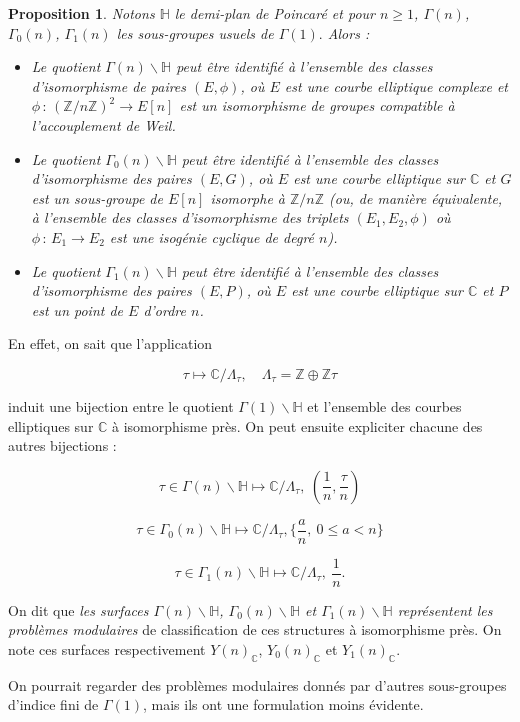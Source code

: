 \documentclass[11pt,a4paper]{article}
\newcommand{\Z}{\mathbb{Z}}
\newcommand{\C}{\mathbb{C}}
\renewcommand{\H}{\mathbb{H}}
\renewcommand{\b}{\backslash}
\newcommand{\vers}{\rightarrow}
\newcommand{\de}{\,:\,}
\newtheorem{prop}[thm]{Proposition}
\theoremstyle{definition}
\begin{document}
\begin{prop}

Notons $\H$ le demi-plan de Poincaré et pour $n\geq 1$, $\Gamma(n)$, $\Gamma_0(n)$, $\Gamma_1(n)$ les sous-groupes usuels de $\Gamma(1).$ Alors :

\begin{itemize}
\item Le quotient $\Gamma(n)\b \H$ peut être identifié à l'ensemble des classes d'isomorphisme de paires $(E,\phi)$, où $E$ est une courbe elliptique complexe et $\phi\de (\Z/n\Z)^2\vers E[n]$ est un isomorphisme de groupes compatible à l'accouplement de Weil.
\item Le quotient $\Gamma_0(n)\b \H$ peut être identifié à l'ensemble des classes d'isomorphisme des paires $(E,G)$, où $E$ est une courbe elliptique sur $\C$ et $G$ est un sous-groupe de $E[n]$ isomorphe à $\Z/n\Z$ (ou, de manière équivalente, à l'ensemble des classes d'isomorphisme des triplets $(E_1, E_2, \phi)$ où $\phi\de E_1\vers E_2$ est une isogénie cyclique de degré $n$).
\item Le quotient $\Gamma_1(n)\b \H$ peut être identifié à l'ensemble des classes d'isomorphisme des paires $(E,P)$, où $E$ est une courbe elliptique sur $\C$ et $P$ est un point de $E$ d'ordre $n$.
\end{itemize}

\end{prop}

En effet, on sait que l'application

$$\tau \longmapsto \C/\Lambda_\tau,\quad \Lambda_\tau = \Z \oplus \Z\tau$$

induit une bijection entre le quotient $\Gamma(1)\b \H$ et l'ensemble des courbes elliptiques sur $\C$ à isomorphisme près. On peut ensuite expliciter chacune des autres bijections :

$$\tau\in \Gamma(n)\b \H \longmapsto \C/\Lambda_\tau,\ (\frac{1}{n},\frac{\tau}{n})$$

$$\tau\in \Gamma_0(n)\b \H \longmapsto \C/\Lambda_\tau, \{\frac{a}{n},\ 0\leq a<n\}$$

$$\tau\in \Gamma_1(n)\b \H \longmapsto \C/\Lambda_\tau,\ \frac{1}{n}.$$

On dit que \emph{les surfaces $\Gamma(n)\b \H$, $\Gamma_0(n)\b \H$ et $\Gamma_1(n)\b \H$ représentent les problèmes modulaires} de classification de ces structures à isomorphisme près. On note ces surfaces respectivement $Y(n)_\C$, $Y_0(n)_\C$ et $Y_1(n)_\C$.

On pourrait regarder des problèmes modulaires donnés par d'autres sous-groupes d'indice fini de $\Gamma(1)$, mais ils ont une formulation moins évidente.
\end{document}
